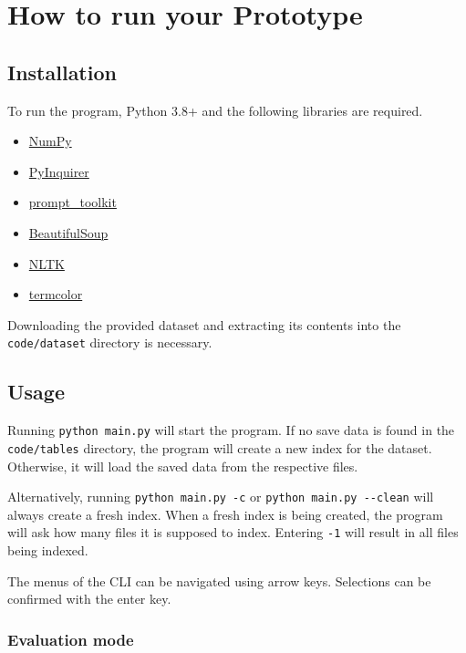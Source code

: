 \section{How to run your Prototype}
\label{sec:guide}

\subsection{Installation}

To run the program, Python 3.8+ and the following libraries are required.

\begin{itemize}
  \item \href{https://numpy.org}{NumPy}
  \item \href{https://github.com/CITGuru/PyInquirer}{PyInquirer}
  \item \href{https://github.com/prompt-toolkit/python-prompt-toolkit}{prompt\_toolkit}
  \item \href{https://www.crummy.com/software/BeautifulSoup/bs4/doc/}{BeautifulSoup}
  \item \href{https://www.nltk.org}{NLTK}
  \item \href{https://pypi.org/project/termcolor/}{termcolor}
\end{itemize}

Downloading the provided dataset and extracting its contents into the \verb|code/dataset| directory is necessary.

\subsection{Usage}

Running \verb|python main.py| will start the program.
If no save data is found in the \verb|code/tables| directory, the program will create a new index for the dataset.
Otherwise, it will load the saved data from the respective files.

Alternatively, running \verb|python main.py -c| or \verb|python main.py --clean| will always create a fresh index.
When a fresh index is being created, the program will ask how many files it is supposed to index.
Entering \verb|-1| will result in all files being indexed.

The menus of the CLI can be navigated using arrow keys.
Selections can be confirmed with the enter key.

\subsubsection{Evaluation mode}

